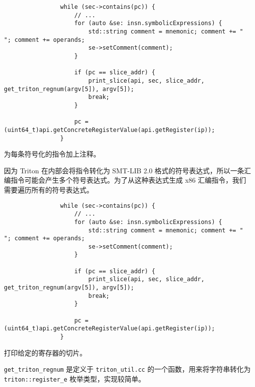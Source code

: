 \documentclass{ctexbeamer}
\begin{document}
    \begin{frame}[fragile]

        {
            \scriptsize
            \begin{verbatim}
                while (sec->contains(pc)) {
                    // ...
                    for (auto &se: insn.symbolicExpressions) {
                        std::string comment = mnemonic; comment += " "; comment += operands;
                        se->setComment(comment);
                    }

                    if (pc == slice_addr) {
                        print_slice(api, sec, slice_addr, get_triton_regnum(argv[5]), argv[5]);
                        break;
                    }

                    pc = (uint64_t)api.getConcreteRegisterValue(api.getRegister(ip));
                }
            \end{verbatim}
        }

        为每条符号化的指令加上注释。\pause

        因为 Triton 在内部会将指令转化为 SMT-LIB 2.0 格式的符号表达式，所以一条汇编指令可能会产生多个符号表达式。为了从这种表达式生成 x86 汇编指令，我们需要遍历所有的符号表达式。
    
    \end{frame}

    \begin{frame}[fragile]

        {
            \scriptsize
            \begin{verbatim}
                while (sec->contains(pc)) {
                    // ...
                    for (auto &se: insn.symbolicExpressions) {
                        std::string comment = mnemonic; comment += " "; comment += operands;
                        se->setComment(comment);
                    }

                    if (pc == slice_addr) {
                        print_slice(api, sec, slice_addr, get_triton_regnum(argv[5]), argv[5]);
                        break;
                    }

                    pc = (uint64_t)api.getConcreteRegisterValue(api.getRegister(ip));
                }
            \end{verbatim}
        }

        打印给定的寄存器的切片。\pause

        \texttt{get_triton_regnum} 是定义于 \texttt{triton_util.cc} 的一个函数，用来将字符串转化为 \texttt{triton::register_e} 枚举类型，实现较简单。
    
    \end{frame}
\end{document}
